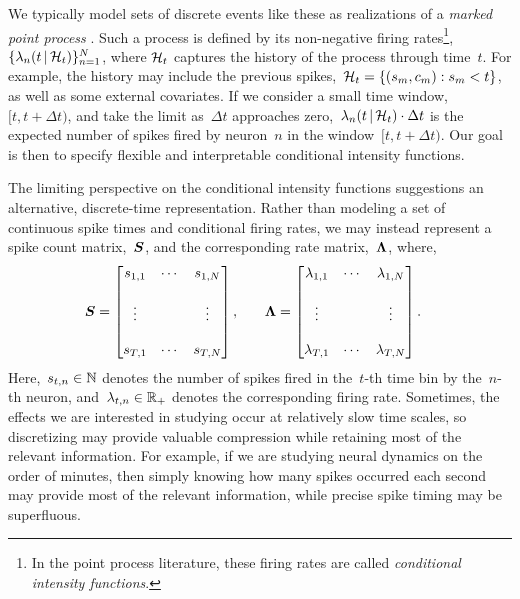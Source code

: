 We typically model sets of discrete events like these as realizations
of a \emph{marked point process} \citep{daley2003introduction1}. Such a
process is defined by its non-negative firing rates\footnote{In the
  point process literature, these firing rates are called
  \emph{conditional intensity functions}.},
${\{\lambda_n(t \,|\, \mathcal{H}_t)\}_{n=1}^N}$, where $\mathcal{H}_t$ captures
the history of the process through time~$t$. For example, the history
may include the previous spikes,~${\mathcal{H}_t = \{(s_m, c_m): s_m < t\}}$,
as well as some external covariates.  If we consider a small time
window,~${[t, t+\Delta t)}$, and take the limit as~$\Delta t$
approaches zero,~${\lambda_n(t \,|\, \mathcal{H}_t) \cdot \Delta t}$ is the
expected number of spikes fired by neuron~$n$ in the
window~${[t, t+\Delta t)}$. Our goal is then to specify flexible and
interpretable conditional intensity
functions. 

The limiting perspective on the conditional intensity functions
suggestions an alternative, discrete-time representation.  Rather than
modeling a set of continuous spike times and conditional firing rates,
we may instead represent a spike count matrix,~$\boldsymbol{S}$, and the
corresponding rate matrix,~$\boldsymbol{\Lambda}$, where,
\begin{align*}
  \boldsymbol{S} &= 
        \begin{bmatrix}
          s_{1,1} & \cdots & s_{1,N} \\
          & & \\
          \vdots  &        & \vdots  \\ 
          & & \\
          s_{T,1} & \cdots & s_{T,N}
        \end{bmatrix}, 
  & & &
  \boldsymbol{\Lambda} &= 
        \begin{bmatrix}
          \lambda_{1,1} & \cdots & \lambda_{1,N} \\
          & & \\
          \vdots  &        & \vdots  \\ 
          & & \\
          \lambda_{T,1} & \cdots & \lambda_{T,N}
        \end{bmatrix}.
\end{align*}
Here,~$s_{t,n} \in \mathbb{N}$ denotes the number of spikes fired in
the~$t$-th time bin by the~$n$-th neuron, and~${\lambda_{t,n} \in \mathbb{R}_+}$ denotes 
the corresponding firing rate. Sometimes, the effects we
are interested in studying occur at relatively slow time scales, so
discretizing may provide valuable compression while retaining most of
the relevant information. For example, if we are studying neural
dynamics on the order of minutes, then simply knowing how many spikes
occurred each second may provide most of the relevant information, while
precise spike timing may be superfluous.


